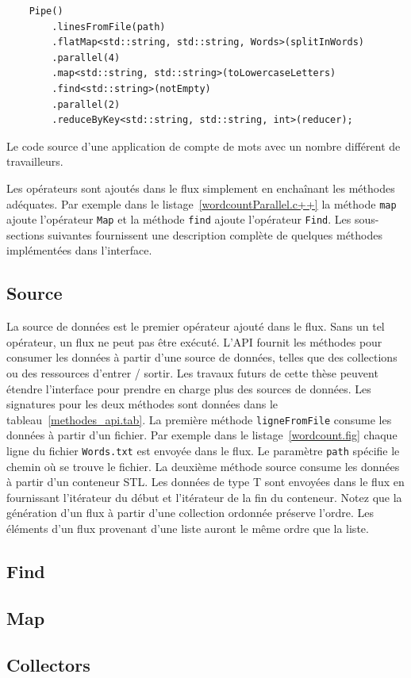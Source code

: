 \begin{Listing}[tbp]
\begin{lstlisting}
	Pipe()
		.linesFromFile(path) 
		.flatMap<std::string, std::string, Words>(splitInWords)
		.parallel(4)
		.map<std::string, std::string>(toLowercaseLetters)
		.find<std::string>(notEmpty)
		.parallel(2)
		.reduceByKey<std::string, std::string, int>(reducer);
\end{lstlisting}
\caption{Le code source d'une application de compte de mots avec un nombre diff\'erent de travailleurs.}
\label{wordcountParallel.c++}
\end{Listing}

Les op\'erateurs sont ajout\'es dans le flux simplement en encha\^inant les m\'ethodes ad\'equates. Par exemple dans le listage~\ref{wordcountParallel.c++} la m\'ethode \texttt{map} ajoute l'opérateur \texttt{Map} et la m\'ethode \texttt{find} ajoute l'op\'erateur \texttt{Find}. Les sous-sections suivantes fournissent une description compl\`ete de quelques m\'ethodes impl\'ement\'ees dans l'interface.

\subsection{Source}

La source de donn\'ees est le premier op\'erateur ajout\'e dans le flux. Sans un tel op\'erateur, un flux ne peut pas \^etre ex\'ecut\'e. L'API fournit les m\'ethodes pour consumer les donn\'ees \`a partir d'une source de donn\'ees, telles que des collections ou des ressources d'entrer / sortir. Les travaux futurs de cette th\`ese peuvent \'etendre l'interface pour prendre en charge plus des sources de donn\'ees. Les signatures pour les deux m\'ethodes sont donn\'ees dans le tableau~\ref{methodes_api.tab}. La premi\`ere m\'ethode \texttt{ligneFromFile} consume les donn\'ees \`a partir d'un fichier.  Par exemple dans le listage~\ref{wordcount.fig} chaque ligne du fichier \texttt{Words.txt} est envoy\'ee dans le flux. Le param\`etre \texttt{path} sp\'ecifie le chemin o\`u se trouve le fichier. La deuxi\`eme m\'ethode source consume les donn\'ees \`a partir d'un conteneur STL. Les donn\'ees de type T sont envoy\'ees dans le flux en fournissant l'it\'erateur du d\'ebut et l'it\'erateur de la fin du conteneur. Notez que la g\'en\'eration d'un flux \`a partir d'une collection ordonn\'ee pr\'eserve l'ordre. Les \'el\'ements d'un flux provenant d'une liste auront le m\^eme ordre que la liste.


\subsection{Find}

\subsection{Map}

\subsection{Collectors}